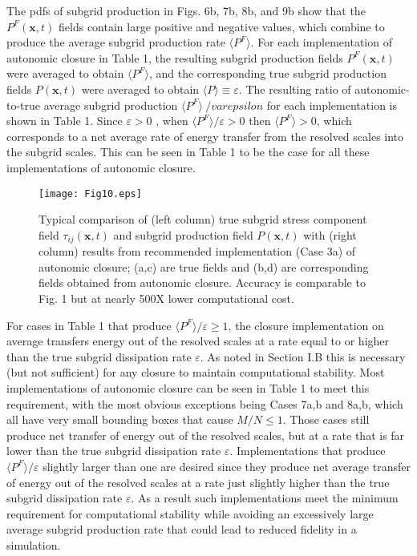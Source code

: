 The pdfs of subgrid production in Figs. 6b, 7b, 8b, and 9b show that the $P^F(\mathbf{x},t)$  fields contain large positive and negative values, which combine to produce the average subgrid production rate $\langle P^F \rangle$. For each implementation of autonomic closure in Table 1, the resulting  subgrid production fields $P^F(\mathbf{x},t)$  were averaged to obtain $\langle P^F \rangle$, and the corresponding true subgrid production fields $P(\mathbf{x},t)$   were averaged to obtain $\langle P \rangle \equiv \varepsilon$. The resulting ratio of autonomic-to-true average subgrid production $\langle P^F \rangle\ /varepsilon$  for each implementation is shown in Table 1. Since $\varepsilon > 0$ , when  $\langle P^F\rangle/ \varepsilon > 0$  then $\langle P^F \rangle > 0$, which corresponds to a net average rate of energy transfer from the resolved scales into the subgrid scales.  This can be seen in Table 1 to be the case for all these implementations of autonomic closure. 

%
\begin{figure}
	\begin{center}
	\texttt{[image: Fig10.eps]}
	\caption{Typical comparison of (left column) true subgrid stress component field $\tau_{ij}(\mathbf{x},t)$ and subgrid production field $P(\mathbf{x},t)$ with (right column) results from recommended implementation (Case 3a) of autonomic closure; (a,c) are true fields and (b,d) are corresponding fields obtained from autonomic closure. Accuracy is comparable to Fig. 1 but at nearly 500X lower computational cost.}
	\label{F:10}
	\end{center}
\end{figure}
%
%

For cases in Table 1 that produce $\langle P^F \rangle/\varepsilon \geq 1$, the closure implementation on average transfers energy out of the resolved scales at a rate equal to or higher than the true subgrid dissipation rate $\varepsilon$. As noted in Section I.B this is necessary (but not sufficient) for any closure to maintain computational stability.  Most implementations of autonomic closure can be seen in Table 1 to meet this requirement, with the most obvious exceptions being Cases 7a,b and 8a,b, which all have very small bounding boxes that cause $M/N \leq 1$. Those cases still produce net transfer of energy out of the resolved scales, but at a rate that is far lower than the true subgrid dissipation rate $\varepsilon$. Implementations that produce  $\langle P^F \rangle/\varepsilon$  slightly larger than one are desired since they produce net average transfer of energy out of the resolved scales at a rate just slightly higher than the true subgrid dissipation rate $\varepsilon$. As a result such implementations meet the minimum requirement for computational stability while avoiding an excessively large average subgrid production rate that could lead to reduced fidelity in a simulation. 

